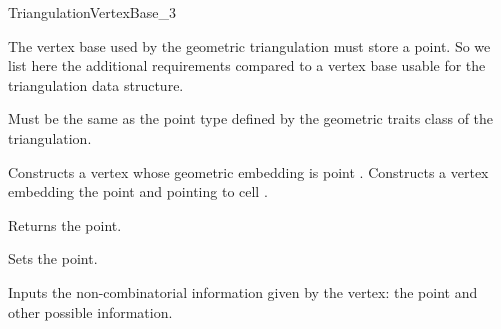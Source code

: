 

\begin{ccRefConcept}{TriangulationVertexBase_3}


\ccDefinition

The vertex base used by the geometric triangulation must store a point.
So we list here the additional requirements compared to a vertex base usable
for the triangulation data structure.


\ccTypes
{}
{Must be the same as the point type 
defined by the geometric traits class of the triangulation.} 

\ccCreation
{}  %


{Constructs a vertex whose geometric embedding is point .} 
\ccGlue
{}
{Constructs a vertex embedding the point  and pointing to cell .}

\ccAccessFunctions
{}

{Returns the point.} 


{Sets the point.} 


{Inputs the non-combinatorial information given by the vertex: 
the point and other possible information.}


\end{ccRefConcept}
